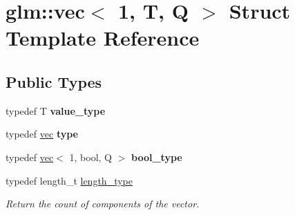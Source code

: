 \hypertarget{structglm_1_1vec_3_011_00_01T_00_01Q_01_4}{}\section{glm\+:\+:vec$<$ 1, T, Q $>$ Struct Template Reference}
\label{structglm_1_1vec_3_011_00_01T_00_01Q_01_4}
\subsection*{Public Types}
\begin{DoxyCompactItemize}
\item 
\mbox{\label{structglm_1_1vec_3_011_00_01T_00_01Q_01_4_a0d473625a844d6df09585a2a2eed637c}} 
typedef T {\bfseries value\+\_\+type}
\item 
\mbox{\label{structglm_1_1vec_3_011_00_01T_00_01Q_01_4_acc52e9f1fce6c99322df114842a855dd}} 
typedef \hyperlink{structglm_1_1vec}{vec} {\bfseries type}
\item 
\mbox{\label{structglm_1_1vec_3_011_00_01T_00_01Q_01_4_abf395a27aa73d1032bd2810013358668}} 
typedef \hyperlink{structglm_1_1vec}{vec}$<$ 1, bool, Q $>$ {\bfseries bool\+\_\+type}
\item 
\mbox{\label{structglm_1_1vec_3_011_00_01T_00_01Q_01_4_a37415eee3b59cf93cdb752a2b30fe5e6}} 
typedef length\+\_\+t \hyperlink{structglm_1_1vec_3_011_00_01T_00_01Q_01_4_a37415eee3b59cf93cdb752a2b30fe5e6}{length\+\_\+type}
\begin{DoxyCompactList}\small\item\em Return the count of components of the vector. \end{DoxyCompactList}\end{DoxyCompactItemize}
